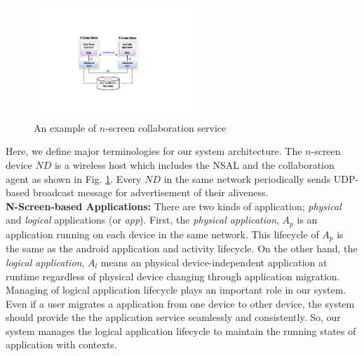 \documentclass{sig-alternate}
\begin{document}

    \begin{figure}[htb] %
    \centering
    \includegraphics[width=6cm,keepaspectratio]{basicmodel}
    \caption{An example of $n$-screen collaboration service}
    \label{fig:basicmodel}
    \end{figure}


Here, we define major terminologies for our system architecture. The $n$-screen device $ND$ is a wireless host which includes the NSAL and the collaboration agent as shown in Fig. \ref{fig:basicmodel}.  Every $ND$ in the same network periodically sends UDP-based broadcast message for advertisement of their aliveness.\\

\noindent
\textbf{N-Screen-based Applications: }
There are two kinds of application; \textit{physical} and \textit{logical} applications (or \textit{app}).
First, the \textit{physical application}, $A_p$ is an application running on each device in the same network.  
This lifecycle of  $A_p$ is the same as the android application and activity lifecycle.
On the other hand, the \textit{logical application}, $A_l$ means an physical device-independent application at runtime regardless of physical device changing through application migration.
Managing of logical application lifecycle plays an important role in our system.
Even if a user migrates a application from one device to other device, 
the system should provide the the application service  seamlessly and consistently. 
So, our system manages the logical application lifecycle to maintain the running states of application with contexts.\\
\end{document}
